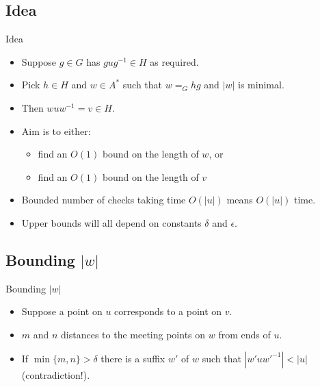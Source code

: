 \documentclass{beamer}
\begin{document}
\subsection{Idea}

\begin{frame}{Idea}
  \begin{itemize}
    \item Suppose $g \in G$ has $gug^{-1} \in H$ as required.
	\pause
	\item Pick $h \in H$ and $w \in A^*$ such that $w =_G hg$ and $|w|$ is minimal.
	\item Then $wuw^{-1} = v \in H$.
	\item Aim is to either:
	\pause
	\begin{itemize}
	  \item find an $O(1)$ bound on the length of $w$, or
	  \pause
	  \item find an $O(1)$ bound on the length of $v$
	\end{itemize}
	\pause
	\item Bounded number of checks taking time $O(|u|)$ means $O(|u|)$ time.
	\item Upper bounds will all depend on constants $\delta$ and $\epsilon$.
  \end{itemize}
\end{frame}

\subsection{Bounding $|w|$}

\begin{frame}{Bounding $|w|$}
  \begin{itemize}
    \item Suppose a point on $u$ corresponds to a point on $v$.
	\item $m$ and $n$ distances to the meeting points on $w$ from ends of $u$.
	\begin{figure}
	
	\end{figure}
	\pause
	\item If $\min\{m,n\} > \delta$ there is a suffix $w'$ of $w$ such that $|w'uw'^{-1}| < |u|$ (contradiction!).
  \end{itemize}
\end{frame}
\end{document}
